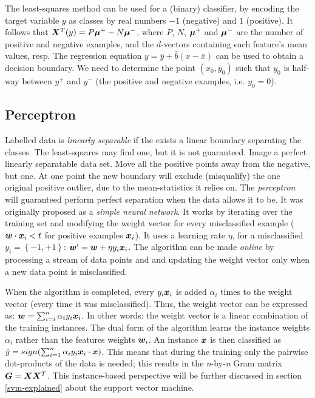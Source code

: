 The least-squares method can be used for a (binary) classifier, by encoding the target variable $y$ as classes by real numbers $-1$ (negative) and $1$ (positive).
It follows that $\matrixsym{X}^T\vectorsym(y) = P \vectorsym{\mu^+} - N \vectorsym{\mu^-}$, where $P$, $N$, $\vectorsym{\mu^+}$ and $\vectorsym{\mu^-}$ are the number of positive and negative examples, and the $d$-vectors containing each feature's mean values, resp.
The regression equation $y = \bar{y} + \hat{b}(x - \bar{x})$ can be used to obtain a decision boundary.
We need to determine the point $(x_0, y_0)$ such that $y_0$ is half-way between $y^+$ and $y^-$ (the positive and negative examples, i.e. $y_0 = 0$).


\subsection{Perceptron}\label{perceptron}
Labelled data is \emph{linearly separable} if the exists a linear boundary separating the classes.
The least-squares may find one, but it is not guaranteed.
Image a perfect linearly separatable data set.
Move all the positive points away from the negative, but one.
At one point the new boundary will exclude (misqualify) the one original positive outlier, due to the mean-statistics it relies on.
The \emph{perceptron} will guaranteed perform perfect separation when the data allows it to be.
It was originally proposed as a \emph{simple neural network}.
It works by iterating over the training set and modifying the weight vector for every misclassified example ($\vectorsym{w} \cdot \vectorsym{x}_i < t$ for positive examples $\vectorsym{x}_i$).
It uses a learning rate $\eta$, for a misclassified $y_i = \left\{-1,+1\right\}$: $\vectorsym{w}' = \vectorsym{w} + \eta y_i \vectorsym{x}_i$.
The algorithm can be made \emph{online} by processing a stream of data points and and updating the weight vector only when a new data point is misclassified.

When the algorithm is completed, every $y_i\vectorsym{x}_i$ is added $\alpha_i$ times to the weight vector (every time it was misclassified).
Thus, the weight vector can be expressed as: $\vectorsym{w} = \sum_{i=i}^n \alpha_i y_i \vectorsym{x}_i$.
In other words: the weight vector is a linear combination of the training instances.
The dual form of the algorithm learns the instance weights $\alpha_i$ rather than the features weights $\vectorsym{w}_i$.
An instance $\vectorsym{x}$ is then classified as $\hat{y} = sign(\sum_{i=1}^n \alpha_i y_i \vectorsym{x}_i \cdot \vectorsym{x})$.
This means that during the training only the pairwise dot-products of the data is needed; this results in the \emph{n}-by-\emph{n} Gram matrix $\matrixsym{G} = \matrixsym{X}\matrixsym{X}^T$.
This instance-based perspective will be further discussed in section \ref{svm-explained} about the support vector machine.


